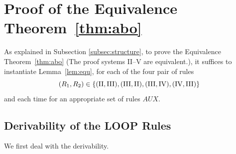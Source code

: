 \documentclass[runningheads]{llncs}       %
\newcommand{\AUX}{\mathit{AUX}}
\begin{document}







\section{Proof of the Equivalence Theorem~\ref{thm:abo}}
\label{sec:proof}

As explained in Subsection \ref{subsec:structure}, to prove the
Equivalence Theorem~\ref{thm:abo} (The proof systems II--V are equivalent.),
it suffices to instantiate Lemma~\ref{lem:equ}, 
for each of the four pair of rules
\[
  (R_1, R_2) \in \mbox{$\{{(\mathrm{II}, \mathrm{III}),
    (\mathrm{III},\mathrm{II}),
    (\mathrm{III}, \mathrm{IV}),
    (\mathrm{IV}, \mathrm{III})}\}$}
\]
and each time for an appropriate set of rules $\AUX$.


\subsection{Derivability of the LOOP Rules}
\label{subsec:proof-derivability}

We first deal with the derivability.
\end{document}
